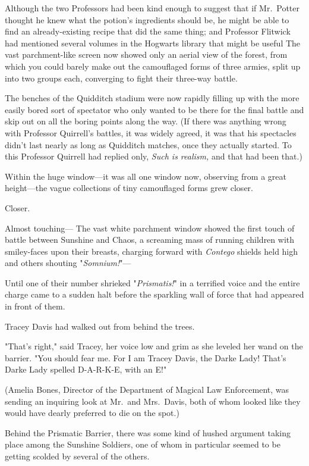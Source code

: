 Although the two Professors had been kind enough to suggest that if Mr.~Potter
thought he knew what the potion's ingredients should be, he might be able to
find an already-existing recipe that did the same thing; and Professor Flitwick
had mentioned several volumes in the Hogwarts library that might be
useful{\el}
\sbreak
The vast parchment-like screen now showed only an aerial view of the forest,
from which you could barely make out the camouflaged forms of three armies,
split up into two groups each, converging to fight their three-way battle.

The benches of the Quidditch stadium were now rapidly filling up with the more
easily bored sort of spectator who only wanted to be there for the final battle
and skip out on all the boring points along the way. (If there was anything
wrong with Professor Quirrell's battles, it was widely agreed, it was that his
spectacles didn't last nearly as long as Quidditch matches, once they actually
started. To this Professor Quirrell had replied only, \emph{Such is realism,}
and that had been that.)

Within the huge window—it was all one window now, observing from a great
height—the vague collections of tiny camouflaged forms grew closer.

Closer.

Almost touching—
\sbreak
The vast white parchment window showed the first touch of battle between
Sunshine and Chaos, a screaming mass of running children with smiley-faces upon
their breasts, charging forward with \emph{Contego} shields held high and
others shouting "\emph{Somnium!}"—

Until one of their number shrieked "\emph{Prismatis!}" in a terrified voice and
the entire charge came to a sudden halt before the sparkling wall of force that
had appeared in front of them.

Tracey Davis had walked out from behind the trees.

"That's right," said Tracey, her voice low and grim as she leveled her wand on
the barrier. "You should fear me. For I am Tracey Davis, the Darke Lady! That's
Darke Lady spelled D-A-R-K-E, with an E!"

(Amelia Bones, Director of the Department of Magical Law Enforcement, was
sending an inquiring look at Mr.~and Mrs.~Davis, both of whom looked like they
would have dearly preferred to die on the spot.)

Behind the Prismatic Barrier, there was some kind of hushed argument taking
place among the Sunshine Soldiers, one of whom in particular seemed to be
getting scolded by several of the others.

